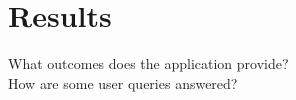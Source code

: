 \section{Results}
What outcomes does the application provide? \\
How are some user queries answered?